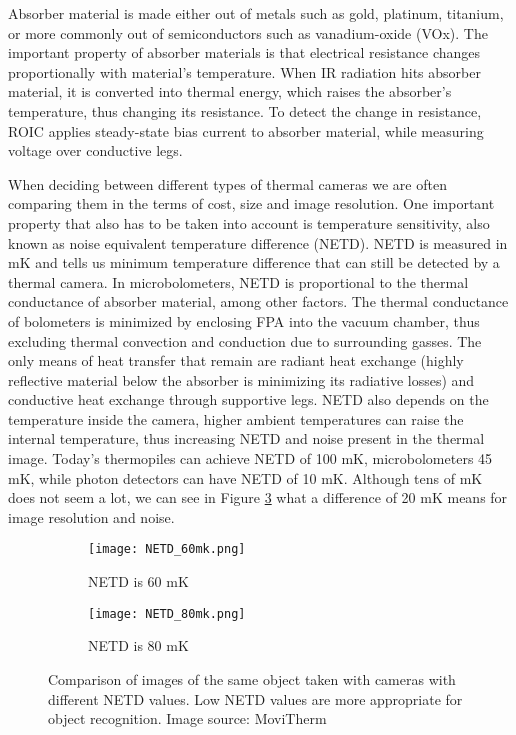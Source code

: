 Absorber material is made either out of metals such as gold, platinum, titanium, or more commonly out of semiconductors such as vanadium-oxide (VOx)\cite{thermal_article}.
The important property of absorber materials is that electrical resistance changes proportionally with material's temperature\cite{thermal_book}.
When IR radiation hits absorber material, it is converted into thermal energy, which raises the absorber's temperature, thus changing its resistance.
To detect the change in resistance, ROIC applies steady-state bias current to absorber material, while measuring voltage over conductive legs\cite{thermal_book}. 

When deciding between different types of thermal cameras we are often comparing them in the terms of cost, size and image resolution.
One important property that also has to be taken into account is temperature sensitivity, also known as noise equivalent temperature difference (NETD).
NETD is measured in \si{\milli\kelvin} and tells us minimum temperature difference that can still be detected by a thermal camera.
In microbolometers, NETD is proportional to the thermal conductance of absorber material, among other factors\cite{thermal_book}.
The thermal conductance of bolometers is minimized by enclosing FPA into the vacuum chamber, thus excluding thermal convection and conduction due to surrounding gasses.
The only means of heat transfer that remain are radiant heat exchange (highly reflective material below the absorber is minimizing its radiative losses) and conductive heat exchange through supportive legs.
NETD also depends on the temperature inside the camera, higher ambient temperatures can raise the internal temperature, thus increasing NETD and noise present in the thermal image.
Today's thermopiles can achieve NETD of 100 \si{\milli\kelvin}, microbolometers 45 \si{\milli\kelvin}, while photon detectors can have NETD of 10 \si{\milli\kelvin}.
Although tens of \si{\milli\kelvin} does not seem a lot, we can see in Figure \ref{NETD} what a difference of 20 \si{\milli\kelvin} means for image resolution and noise.
\newline

\begin{figure}[ht]
    \begin{subfigure}{0.5\textwidth}
        \centering
        \texttt{[image: NETD\_60mk.png]} 
        \caption{NETD is 60 \si{\milli\kelvin}}
        \label{NETD_60mk}
    \end{subfigure}
    \begin{subfigure}{0.5\textwidth}
        \centering
        \texttt{[image: NETD\_80mk.png]}
        \caption{NETD is 80 \si{\milli\kelvin}}
        \label{NETD_80mk}
    \end{subfigure}
    \caption[Comparison of images of the same object taken with cameras with different NETD values.]{Comparison of images of the same object taken with cameras with different NETD values. Low NETD values are more appropriate for object recognition. Image source: MoviTherm \cite{NETD}}
    \label{NETD}
\end{figure}


